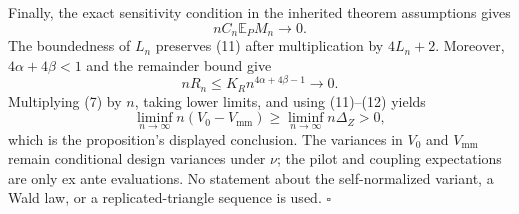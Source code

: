 Finally, the exact sensitivity condition in the inherited theorem assumptions gives
\[
 nC_n\mathbb E_PM_n\longrightarrow0.
 \tag{11}
\]
The boundedness of \(L_n\) preserves (11) after multiplication by \(4L_n+2\).  Moreover, \(4\alpha+4\beta<1\) and the remainder bound give
\[
 nR_n\leq K_Rn^{4\alpha+4\beta-1}\longrightarrow0.
 \tag{12}
\]
Multiplying (7) by \(n\), taking lower limits, and using (11)--(12) yields
\[
 \liminf_{n\to\infty}n(V_0-V_{\mathrm{mm}})
 \geq\liminf_{n\to\infty}n\Delta_Z>0,
\]
which is the proposition's displayed conclusion.  The variances in \(V_0\) and \(V_{\mathrm{mm}}\) remain conditional design variances under \(\nu\); the pilot and coupling expectations are only ex ante evaluations.  No statement about the self-normalized variant, a Wald law, or a replicated-triangle sequence is used. \(\square\)
